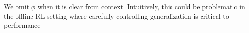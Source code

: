 We omit $\phi$ when it is clear from context. %
Intuitively, this could be problematic in the offline RL setting where carefully controlling generalization is critical to performance~\citep{levine2020offline}
